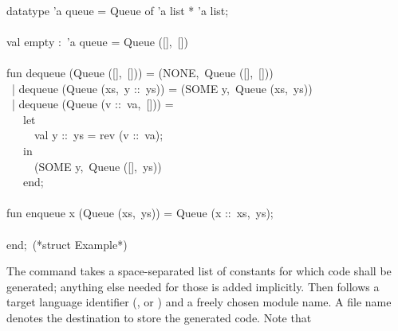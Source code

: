 \begin{isabellebody}
\begin{isamarkuptext}
\hspace*{0pt}\\
\hspace*{0pt}datatype 'a queue = Queue of 'a list * 'a list;\\
\hspace*{0pt}\\
\hspace*{0pt}val empty :~'a queue = Queue ([],~[])\\
\hspace*{0pt}\\
\hspace*{0pt}fun dequeue (Queue ([],~[])) = (NONE,~Queue ([],~[]))\\
\hspace*{0pt} ~| dequeue (Queue (xs,~y ::~ys)) = (SOME y,~Queue (xs,~ys))\\
\hspace*{0pt} ~| dequeue (Queue (v ::~va,~[])) =\\
\hspace*{0pt} ~~~let\\
\hspace*{0pt} ~~~~~val y ::~ys = rev (v ::~va);\\
\hspace*{0pt} ~~~in\\
\hspace*{0pt} ~~~~~(SOME y,~Queue ([],~ys))\\
\hspace*{0pt} ~~~end;\\
\hspace*{0pt}\\
\hspace*{0pt}fun enqueue x (Queue (xs,~ys)) = Queue (x ::~xs,~ys);\\
\hspace*{0pt}\\
\hspace*{0pt}end;~(*struct Example*)%
\end{isamarkuptext}%
\isamarkuptrue%
%
\endisatagquote
{\isafoldquote}%
%
\isadelimquote
%
\endisadelimquote
%
\begin{isamarkuptext}%
\noindent The \hyperlink{command.export-code}{\mbox{}} command takes a space-separated list of
  constants for which code shall be generated;  anything else needed for those
  is added implicitly.  Then follows a target language identifier
  (,  or ) and a freely chosen module name.
  A file name denotes the destination to store the generated code.  Note that

\end{isamarkuptext}
\end{isabellebody}
